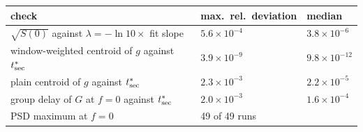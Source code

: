 \begin{tabular}{lll}
\toprule
check & max.\ rel.\ deviation & median \\
\midrule
$\sqrt{S(0)}$ against $\lambda=-\ln10\times$ fit slope & $5.6\times10^{-4}$ & $3.8\times10^{-6}$ \\
window-weighted centroid of $g$ against $t^*_{\rm sec}$ & $3.9\times10^{-9}$ & $9.8\times10^{-12}$ \\
plain centroid of $g$ against $t^*_{\rm sec}$ & $2.3\times10^{-3}$ & $2.2\times10^{-5}$ \\
group delay of $G$ at $f=0$ against $t^*_{\rm sec}$ & $2.0\times10^{-3}$ & $1.6\times10^{-4}$ \\
PSD maximum at $f=0$ & 49 of 49 runs & \\
\bottomrule
\end{tabular}
